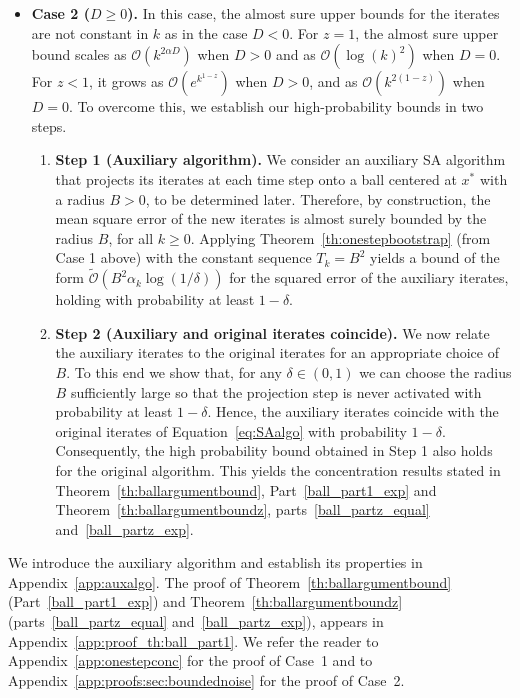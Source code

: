 \documentclass{article}
\begin{document}
\begin{itemize}
    \item {\bf Case 2 ($D \ge 0$).} 
    In this case, the almost sure upper bounds for the iterates are not constant in $k$ as in the case $D < 0$. For $z = 1$, the almost sure upper bound scales as $\mathcal{O}(k^{2\alpha D})$ when $D > 0$ and as $\mathcal{O}(\log(k)^2)$ when $D = 0$. For $z < 1$, it grows as  $\mathcal{O}(e^{k^{1-z}})$ when $D > 0$, and as $\mathcal{O}(k^{2(1-z)})$ when $D = 0$. To overcome this, we establish our high-probability bounds in two steps.
    \begin{enumerate}
        \item {\bf Step 1 (Auxiliary algorithm).} We consider an auxiliary SA algorithm that projects its iterates at each time step onto a ball centered at $x^*$ with a radius $B>0$, to be determined later. Therefore, by construction, the mean square error of the new iterates is almost surely bounded by the radius $B$, for all $k\geq 0$. Applying Theorem~\ref{th:onestepbootstrap} (from Case 1 above) with the constant sequence $T_k = B^2$ yields a bound of the form $\tilde{\mathcal{O}}(B^2 \alpha_k \log(1/\delta))$ for the squared error of the auxiliary iterates, holding with probability at least $1-\delta$. 
        \item {\bf Step 2 (Auxiliary and original iterates coincide).} 
        We now relate the auxiliary iterates to the original iterates for an appropriate choice of $B$. To this end we show that, for any $\delta\in(0,1)$ we can choose the radius $B$ sufficiently large so that the projection step is never activated with probability at least $1-\delta$. Hence, the auxiliary iterates coincide with the original iterates of Equation~\eqref{eq:SAalgo} with probability $1-\delta$. Consequently, the high probability bound obtained in Step 1 also holds for the original algorithm. This yields the concentration results stated in Theorem~\ref{th:ballargumentbound}, Part~\ref{ball_part1_exp} and Theorem~\ref{th:ballargumentboundz}, parts~\ref{ball_partz_equal} and~\ref{ball_partz_exp}. %

    \end{enumerate}
\end{itemize}

We introduce the auxiliary algorithm and establish its properties in Appendix~\ref{app:auxalgo}. The proof of Theorem~\ref{th:ballargumentbound} (Part~\ref{ball_part1_exp}) and Theorem~\ref{th:ballargumentboundz} (parts~\ref{ball_partz_equal} and~\ref{ball_partz_exp}), appears in Appendix~\ref{app:proof_th:ball_part1}. We refer the reader to Appendix~\ref{app:onestepconc} for the proof of Case~1 and to Appendix~\ref{app:proofs:sec:boundednoise} for the proof of Case~2.
\end{document}

